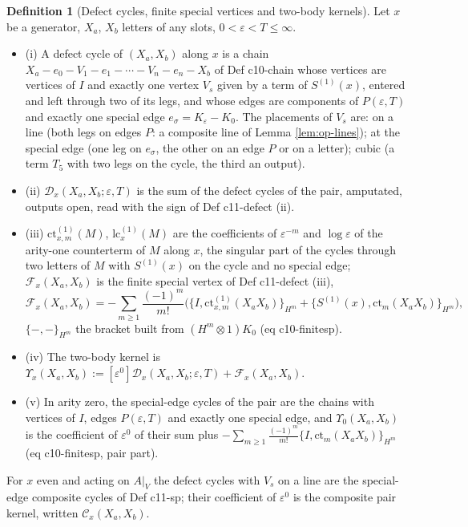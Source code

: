 \documentclass[11pt]{article}
\numberwithin{equation}{section}
\theoremstyle{plain}
\theoremstyle{definition}
\newtheorem{definition}[theorem]{Definition}
\newcommand{\AV}{A|_V}
\newcommand{\lc}{\mathrm{lc}}
\newcommand{\ct}{\mathrm{ct}}
\newcommand{\Comp}{\mathcal C}
\begin{document}
\begin{definition}[Defect cycles, finite special vertices and two-body kernels]
\label{def:op-defect}
Let $x$ be a generator, $X_a$, $X_b$ letters of any slots, $0<\varepsilon<T\le\infty$.
\begin{itemize}
\item (i) A defect cycle of $(X_a,X_b)$ along $x$ is a chain $X_a-e_0-V_1-e_1-\cdots-V_n-e_n-X_b$ of Def c10-chain whose vertices are vertices of $I$ and exactly one vertex $V_s$ given by a term of $S^{(1)}(x)$, entered and left through two of its legs, and whose edges are components of $P(\varepsilon,T)$ and exactly one special edge $e_\sigma=K_\varepsilon-K_0$. The placements of $V_s$ are: on a line (both legs on edges $P$: a composite line of Lemma \ref{lem:op-lines}); at the special edge (one leg on $e_\sigma$, the other on an edge $P$ or on a letter); cubic (a term $T_5$ with two legs on the cycle, the third an output).
\item (ii) $\mathcal D_x(X_a,X_b;\varepsilon,T)$ is the sum of the defect cycles of the pair, amputated, outputs open, read with the sign of Def c11-defect (ii).
\item (iii) $\ct^{(1)}_{x,m}(M)$, $\lc^{(1)}_x(M)$ are the coefficients of $\varepsilon^{-m}$ and $\log\varepsilon$ of the arity-one counterterm of $M$ along $x$, the singular part of the cycles through two letters of $M$ with $S^{(1)}(x)$ on the cycle and no special edge; $\mathcal F_x(X_a,X_b)$ is the finite special vertex of Def c11-defect (iii),
\[
\mathcal F_x(X_a,X_b)=-\sum_{m\ge1}\frac{(-1)^m}{m!}\Big(\big\{I,\ct^{(1)}_{x,m}(X_aX_b)\big\}_{H^m}+\big\{S^{(1)}(x),\ct_m(X_aX_b)\big\}_{H^m}\Big),
\]
$\{-,-\}_{H^m}$ the bracket built from $(H^m\otimes1)K_0$ (eq c10-finitesp).
\item (iv) The two-body kernel is $\Upsilon_x(X_a,X_b):=[\varepsilon^0]\mathcal D_x(X_a,X_b;\varepsilon,T)+\mathcal F_x(X_a,X_b)$.
\item (v) In arity zero, the special-edge cycles of the pair are the chains with vertices of $I$, edges $P(\varepsilon,T)$ and exactly one special edge, and $\Upsilon_0(X_a,X_b)$ is the coefficient of $\varepsilon^0$ of their sum plus $-\sum_{m\ge1}\frac{(-1)^m}{m!}\{I,\ct_m(X_aX_b)\}_{H^m}$ (eq c10-finitesp, pair part).
\end{itemize}
For $x$ even and acting on $\AV$ the defect cycles with $V_s$ on a line are the special-edge composite cycles of Def c11-sp; their coefficient of $\varepsilon^0$ is the composite pair kernel, written $\Comp_x(X_a,X_b)$.
\end{definition}
\end{document}
